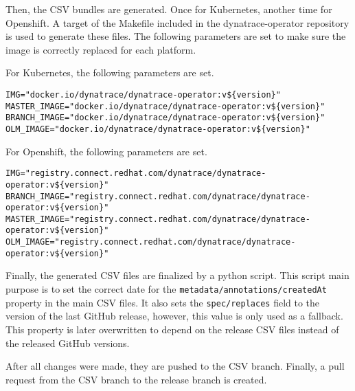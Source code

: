 Then, the CSV bundles are generated.
Once for Kubernetes, another time for Openshift.
A target of the Makefile included in the dynatrace-operator repository is used to generate these files.
The following parameters are set to make sure the image is correctly replaced for each platform.

For Kubernetes, the following parameters are set.

\begin{verbatim}
IMG="docker.io/dynatrace/dynatrace-operator:v${version}"
MASTER_IMAGE="docker.io/dynatrace/dynatrace-operator:v${version}"
BRANCH_IMAGE="docker.io/dynatrace/dynatrace-operator:v${version}"
OLM_IMAGE="docker.io/dynatrace/dynatrace-operator:v${version}"
\end{verbatim}

For Openshift, the following parameters are set.

\begin{verbatim}
IMG="registry.connect.redhat.com/dynatrace/dynatrace-operator:v${version}"
BRANCH_IMAGE="registry.connect.redhat.com/dynatrace/dynatrace-operator:v${version}"
MASTER_IMAGE="registry.connect.redhat.com/dynatrace/dynatrace-operator:v${version}"
OLM_IMAGE="registry.connect.redhat.com/dynatrace/dynatrace-operator:v${version}"
\end{verbatim}

Finally, the generated CSV files are finalized by a python script.
This script main purpose is to set the correct date for the \verb|metadata/annotations/createdAt| property in the main CSV files.
It also sets the \verb|spec/replaces| field to the version of the last GitHub release, however, this value is only used as a fallback.
This property is later overwritten to depend on the release CSV files instead of the released GitHub versions.

After all changes were made, they are pushed to the CSV branch.
Finally, a pull request from the CSV branch to the release branch is created.

